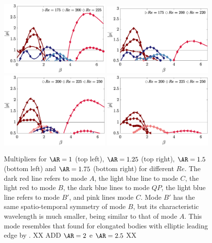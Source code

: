\begin{figure}
  \centering
  \includegraphics[width=0.49\textwidth]{./fig/AR1/neutralb.eps}
  \includegraphics[width=0.49\textwidth]{./fig/AR1p25/neutralb.eps}  
  \includegraphics[width=0.49\textwidth]{./fig/AR1p5/neutralb.eps}    
  \includegraphics[width=0.49\textwidth]{./fig/AR1p75/neutralb.eps}       
  \caption{Multipliers for $\AR=1$ (top left), $\AR=1.25$ (top right), $\AR=1.5$ (bottom left) and $\AR=1.75$ (bottom right) for different $Re$. The dark red line refers to mode $A$, the light blue line to mode $C$, the light red to mode $B$, the dark blue lines to mode $QP$, the light blue line refers to mode $B'$, and pink lines mode $C$. Mode $B'$ has the same spatio-temporal symmetry of mode $B$, but its characteristic wavelength is much smaller, being similar to that of mode $A$. This mode resembles that found for elongated bodies with elliptic leading edge by \cite{ryan-etal-2005}. XX ADD $\AR=2$ e $\AR=2.5$ XX}
  \label{fig:mult_AR1_AR1p75}
\end{figure}
